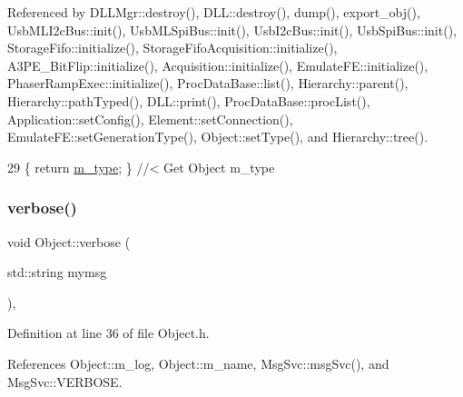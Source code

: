 Referenced by D\+L\+L\+Mgr\+::destroy(), D\+L\+L\+::destroy(), dump(), export\+\_\+obj(), Usb\+M\+L\+I2c\+Bus\+::init(), Usb\+M\+L\+Spi\+Bus\+::init(), Usb\+I2c\+Bus\+::init(), Usb\+Spi\+Bus\+::init(), Storage\+Fifo\+::initialize(), Storage\+Fifo\+Acquisition\+::initialize(), A3\+P\+E\+\_\+\+Bit\+Flip\+::initialize(), Acquisition\+::initialize(), Emulate\+F\+E\+::initialize(), Phaser\+Ramp\+Exec\+::initialize(), Proc\+Data\+Base\+::list(), Hierarchy\+::parent(), Hierarchy\+::path\+Typed(), D\+L\+L\+::print(), Proc\+Data\+Base\+::proc\+List(), Application\+::set\+Config(), Element\+::set\+Connection(), Emulate\+F\+E\+::set\+Generation\+Type(), Object\+::set\+Type(), and Hierarchy\+::tree().


\begin{DoxyCode}
29 \{ \textcolor{keywordflow}{return} \hyperlink{classObject_a457a600fe8c00eb1034374f75110a78c}{m\_type};       \} \textcolor{comment}{//< Get Object m\_type}
\end{DoxyCode}
\mbox{\label{classObject_a83d2db2df682907ea1115ad721c1c4a1}} 
\subsubsection{\texorpdfstring{verbose()}{verbose()}\hspace{0.1cm}{\footnotesize\ttfamily [1/2]}}
{\footnotesize\ttfamily void Object\+::verbose (\begin{DoxyParamCaption}\item[{std\+::string}]{mymsg }\end{DoxyParamCaption})\hspace{0.3cm}{\ttfamily [inline]}, {\ttfamily [inherited]}}



Definition at line 36 of file Object.\+h.



References Object\+::m\+\_\+log, Object\+::m\+\_\+name, Msg\+Svc\+::msg\+Svc(), and Msg\+Svc\+::\+V\+E\+R\+B\+O\+SE.



